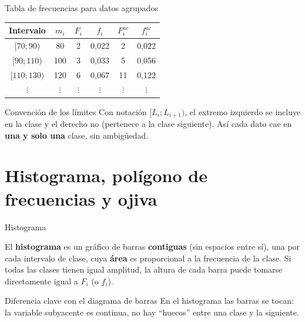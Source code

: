 \documentclass[aspectratio=169,11pt]{beamer}
\begin{document}
\begin{frame}{Tabla de frecuencias para datos agrupados}
\centering
\small
\begin{tabular}{cccccc}
\toprule
Intervalo & $m_i$ & $F_i$ & $f_i$ & $F_i^{ac}$ & $f_i^{ac}$ \\
\midrule
$[70;90)$ & 80 & 2 & 0,022 & 2 & 0,022 \\
$[90;110)$ & 100 & 3 & 0,033 & 5 & 0,056 \\
$[110;130)$ & 120 & 6 & 0,067 & 11 & 0,122 \\
$\vdots$ & $\vdots$ & $\vdots$ & $\vdots$ & $\vdots$ & $\vdots$ \\
\bottomrule
\end{tabular}
\vspace{0.5em}

\normalsize
\begin{block}{Convención de los límites}
Con notación $[L_i;L_{i+1})$, el extremo izquierdo se incluye en la clase y el derecho no (pertenece a la clase siguiente). Así cada dato cae en \textbf{una y solo una} clase, sin ambigüedad.
\end{block}
\end{frame}

\section{Histograma, polígono de frecuencias y ojiva}

\begin{frame}{Histograma}
\begin{definition}
El \textbf{histograma} es un gráfico de barras \textbf{contiguas} (sin espacios entre sí), una por cada intervalo de clase, cuya \textbf{área} es proporcional a la frecuencia de la clase. Si todas las clases tienen igual amplitud, la altura de cada barra puede tomarse directamente igual a $F_i$ (o $f_i$).
\end{definition}
\centering
{}
\begin{alertblock}{Diferencia clave con el diagrama de barras}
En el histograma las barras se tocan: la variable subyacente es continua, no hay ``huecos'' entre una clase y la siguiente.
\end{alertblock}
\end{frame}
\end{document}
